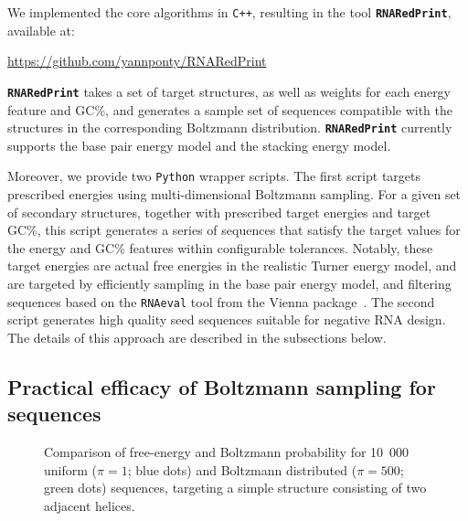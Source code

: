 \documentclass[]{bmcart}
\makeatletter
\newlength{\@aligneps}
\newcommand{\includegraphicstop}[2][]{%
\sbox{\@alignepsbox}{\texttt{[image: \#2]}}%
\setlength{\@aligneps}{-\ht\@alignepsbox}%
\addtolength{\@aligneps}{2ex}%
\raisebox{\@aligneps}{\usebox{\@alignepsbox}}}
\newcommand{\Nuc}[1]{{\sf #1}}
\newcommand{\Cb}{\Nuc{C}}
\newcommand{\Gb}{\Nuc{G}}
\newcommand{\GCb}{\Gb\Cb}
\newcommand{\ourprog}{{\tt \bfseries{}\color{black!85}RNA\textcolor{red!70!black}{Red}Print}}
\newcommand{\revised}[1]{{\color{red} #1}}
\makeatother
\begin{document}
We implemented the core algorithms in \texttt{C++}, resulting in the tool
\ourprog{}, available at: 

{\centering \url{https://github.com/yannponty/RNARedPrint}\\[.3em]}%

\ourprog{}  takes a set of target structures, as well as
weights for each energy feature and \GCb\%, and generates a sample set of sequences compatible with the structures in the corresponding
Boltzmann distribution. \ourprog{} currently supports the base pair
energy model and the stacking energy model.

Moreover, we provide two {\tt Python} wrapper scripts. 
The first script targets prescribed energies using multi-dimensional Boltzmann sampling.
For a given set of secondary structures, together with prescribed target energies
and target \GCb\%, this script generates a series of sequences that satisfy the target values for the energy and
\GCb\% features within configurable tolerances.
Notably, these target energies are actual free energies in the realistic
Turner energy model, and are targeted by efficiently sampling in the
base pair energy model, and filtering sequences based on the {\tt RNAeval} tool from the Vienna package~\cite{Lorenz2011}. The second script generates high quality seed sequences suitable for negative RNA design. The details of this approach are described in the subsections below.

\subsection*{Practical efficacy of Boltzmann sampling for sequences}

\begin{figure}
	\includegraphicstop[width=0.8\textwidth]{Figs/Plots/doublestem_weight1-500_mean}
	\caption{\revised{Comparison of free-energy and Boltzmann probability for 10~000 uniform ($\pi=1$; blue dots) and Boltzmann distributed ($\pi=500$; green dots) sequences, targeting a simple structure consisting of two adjacent helices.}}\label{fig:BoltzmannBenefits}
\end{figure}
\end{document}
